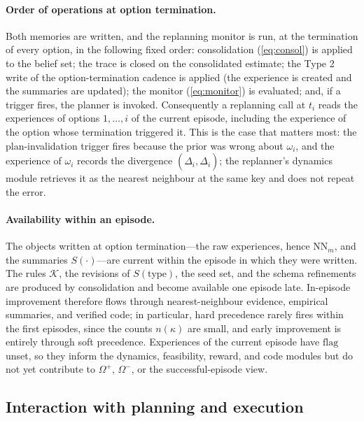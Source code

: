 \documentclass[11pt]{article}
\newcommand{\calK}{\mathcal{K}}
\newcommand{\type}{\mathrm{type}}
\begin{document}
\paragraph{Order of operations at option termination.}
Both memories are written, and the replanning monitor is run, at the termination of every option, in the following fixed order: consolidation (\ref{eq:consol}) is applied to the belief set; the trace is closed on the consolidated estimate; the Type 2 write of the option-termination cadence is applied (the experience is created and the summaries are updated); the monitor (\ref{eq:monitor}) is evaluated; and, if a trigger fires, the planner is invoked. Consequently a replanning call at $t_i$ reads the experiences of options $1,\dots,i$ of the current episode, including the experience of the option whose termination triggered it. This is the case that matters most: the plan-invalidation trigger fires because the prior was wrong about $\omega_i$, and the experience of $\omega_i$ records the divergence $(\hat\Delta_i,\Delta_i)$; the replanner's dynamics module retrieves it as the nearest neighbour at the same key and does not repeat the error.

\paragraph{Availability within an episode.}
The objects written at option termination---the raw experiences, hence $\mathrm{NN}_m$, and the summaries $S(\cdot)$---are current within the episode in which they were written. The rules $\calK$, the revisions of $S(\type)$, the seed set, and the schema refinements are produced by consolidation and become available one episode late. In-episode improvement therefore flows through nearest-neighbour evidence, empirical summaries, and verified code; in particular, hard precedence rarely fires within the first episodes, since the counts $n(\kappa)$ are small, and early improvement is entirely through soft precedence. Experiences of the current episode have $\mathrm{flag}$ unset, so they inform the dynamics, feasibility, reward, and code modules but do not yet contribute to $\Omega^{+}$, $\Omega^{-}$, or the successful-episode view.

\subsection{Interaction with planning and execution}
\label{sec:type2-interaction}
\end{document}
